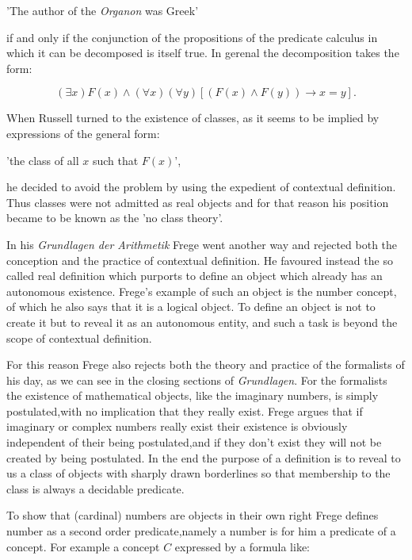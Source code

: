 \documentclass[12pt]{article}
\begin{document}
\begin{center}
'The author of the \emph{Organon} was Greek'
\end{center}

if and only if the conjunction of the propositions of the predicate calculus in which it can be decomposed is itself true. In gerenal the decomposition takes the form:

$$(\exists x) F (x) \wedge (\forall x) (\forall y) [ (F (x) \wedge F (y)) \rightarrow  x = y].$$

When Russell turned to the existence of classes, as it seems to be implied by expressions of the general form:

\begin{center} 
'the class of all $x$ such that $F (x)$',
\end{center}

he decided to avoid the problem by using the expedient of contextual definition. Thus classes were not  admitted as real objects and for that reason  his position became to be known as the 'no class theory'.

In his \emph{Grundlagen der Arithmetik} Frege went another way and rejected both the conception and the practice of contextual definition. He favoured instead the so called real definition which purports to define an object which already has an autonomous existence. Frege's example of such an object is the number concept, of which he also says that it is a  logical object. To define an object is not to create it but to reveal it as an autonomous entity, and such a task is beyond the scope of contextual definition.

For this reason Frege also rejects both the theory and practice of the formalists of his day, as we can see in the closing sections of \emph{Grundlagen}. For the formalists the existence of mathematical objects, like the imaginary numbers, is simply postulated,with no implication that they really exist. Frege argues that if imaginary or complex numbers really exist their existence is obviously  independent of their being postulated,and if they don't exist they will not be created by being postulated. In the end the purpose of a definition is to reveal to us a class of objects with sharply drawn borderlines so that membership to the class is always a decidable predicate. 

To show that (cardinal) numbers are objects in their own right Frege defines number as a second order predicate,namely a number is for him a predicate of a concept. For example a concept $C$ expressed by a formula like:
\end{document}
